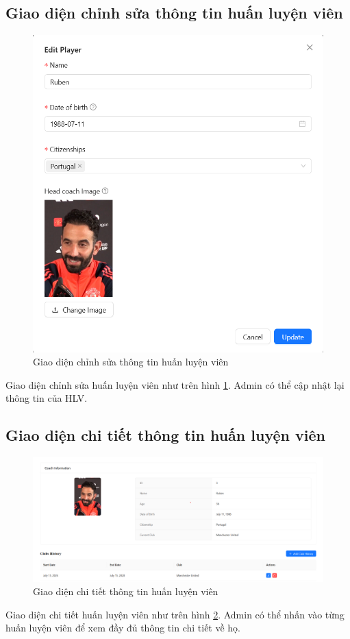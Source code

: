 \documentclass[../BTL.tex]{subfiles}
\begin{document}
\subsection{Giao diện chỉnh sửa thông tin huấn luyện viên}
\begin{figure}
    \centering
    \includegraphics[width=1\linewidth]{Hinhve/admin_edit_coach.png}
    \caption{Giao diện chỉnh sửa thông tin huấn luyện viên}
    \label{fig:admin_edit_coach}
\end{figure}
Giao diện chỉnh sửa huấn luyện viên như trên hình \ref{fig:admin_edit_coach}. Admin có thể cập nhật lại thông tin của HLV.

\subsection{Giao diện chi tiết thông tin huấn luyện viên}
\begin{figure}
    \centering
    \includegraphics[width=1\linewidth]{Hinhve/admin_coach_detail.png}
    \caption{Giao diện chi tiết thông tin huấn luyện viên}
    \label{fig:admin_coach_detail}
\end{figure}
Giao diện chi tiết huấn luyện viên như trên hình \ref{fig:admin_coach_detail}. Admin có thể nhấn vào từng huấn luyện viên để xem đầy đủ thông tin chi tiết về họ.
\end{document}
